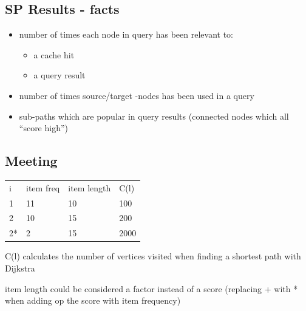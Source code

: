 

\subsection{SP Results - facts}

\begin{itemize}
\item number of times each node in query has been relevant to: 
\begin{itemize}
\item a cache hit
\item a query result
\end{itemize}
\item number of times source/target -nodes has been used in a query
\item sub-paths which are popular in query results (connected nodes which all "`score high"')

\end{itemize}

\subsection{Meeting}

\begin{table}
\begin{tabular}{l |l |l |l}
i & item freq & item length & C(l) \\
1 & 11 & 10 & 100 \\
2 & 10 & 15 & 200 \\
2* & 2 & 15 & 2000 \\
\end{tabular}
\end{table}

C(l) calculates the number of vertices visited when finding a shortest path with Dijkstra


item length could be considered a factor instead of a score (replacing + with * when adding op the score with item frequency)


